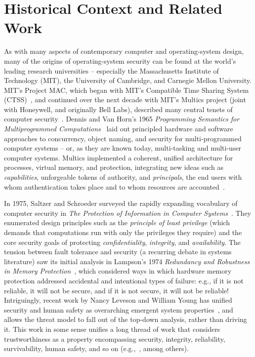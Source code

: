\chapter{Historical Context and Related Work}
\label{chap:historical}



As with many aspects of contemporary computer and operating-system design,
many of the origins
of operating-system security can be found at the world's leading research
universities --
especially the Massachusetts Institute of Technology (MIT), the University of Cambridge,
and Carnegie Mellon University.
MIT's Project MAC, which began with MIT's Compatible Time
Sharing System (CTSS)~\cite{corbato:timesharing},
and continued over the next decade with MIT's Multics
project (joint with Honeywell, and originally Bell Labs),
described many central tenets of computer security~\cite{corbato:multics,Graham68}.
Dennis and Van Horn's 1965 {\em Programming Semantics for Multiprogrammed
Computations}~\cite{dennis:semantics} laid out principled hardware
and software approaches
to concurrency, object naming, and security for multi-programmed computer systems --
or, as they are known today, multi-tasking and multi-user computer systems.
Multics implemented a coherent, unified architecture for processes, virtual memory, and protection,
integrating new ideas such as {\em capabilities}, unforgeable tokens of authority, and
{\em principals}, the end users with whom authentication takes place and to whom resources
are accounted~\cite{Saltzer74}.

In 1975, Saltzer and Schroeder surveyed the rapidly expanding vocabulary of computer
security in {\em The Protection of Information in Computer Systems}~\cite{SaltzerSchroeder75}.
They enumerated design principles such as the {\em principle of least privilege}
(which demands that computations run with only the privileges they require) and
the core security goals of
protecting {\em confidentiality}, {\em integrity}, and {\em availability}.
The tension between fault tolerance and security (a recurring debate in
systems literature) saw its initial analysis in Lampson's 1974
{\em Redundancy and Robustness in Memory Protection}~\cite{LampsonRedund}, which
considered ways in which hardware memory protection addressed accidental and
intentional types of failure: e.g., if it is not reliable, it will not be secure,
and if it is not secure, it will not be reliable!  Intriguingly, recent work
by Nancy Leveson and William Young has unified security and human safety
as overarching emergent system properties~\cite{LevesonYoung14}, and allows
the threat model to fall out of the top-down analysis, rather than driving
it.  This work in some sense
unifies a long thread of work that considers trustworthiness as a property 
encompassing security, integrity, reliability, survivability, human safety, 
and so on (e.g.,~\cite{Neumann06holistic,PSOS}, among others).

